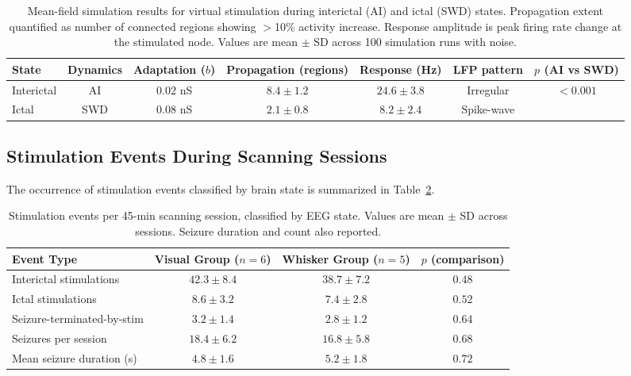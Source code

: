 \documentclass[11pt]{article}
\begin{document}
\begin{table}[H]
\centering
\caption{Mean-field simulation results for virtual stimulation during interictal (AI) and ictal (SWD) states. Propagation extent quantified as number of connected regions showing $>$10\% activity increase. Response amplitude is peak firing rate change at the stimulated node. Values are mean $\pm$ SD across 100 simulation runs with noise.}
\label{tab:simulation}
\begin{tabular}{lcccccc}
\toprule
\textbf{State} & \textbf{Dynamics} & \textbf{Adaptation ($b$)} & \textbf{Propagation (regions)} & \textbf{Response (Hz)} & \textbf{LFP pattern} & \textbf{$p$ (AI vs SWD)} \\
\midrule
Interictal & AI & $0.02$ nS & $8.4 \pm 1.2$ & $24.6 \pm 3.8$ & Irregular & \multirow{2}{*}{$< 0.001$} \\
Ictal & SWD & $0.08$ nS & $2.1 \pm 0.8$ & $8.2 \pm 2.4$ & Spike-wave & \\
\bottomrule
\end{tabular}
\end{table}

\subsection{Stimulation Events During Scanning Sessions}

The occurrence of stimulation events classified by brain state is summarized in Table~\ref{tab:events}.

\begin{table}[H]
\centering
\caption{Stimulation events per 45-min scanning session, classified by EEG state. Values are mean $\pm$ SD across sessions. Seizure duration and count also reported.}
\label{tab:events}
\begin{tabular}{lccc}
\toprule
\textbf{Event Type} & \textbf{Visual Group ($n=6$)} & \textbf{Whisker Group ($n=5$)} & \textbf{$p$ (comparison)} \\
\midrule
Interictal stimulations & $42.3 \pm 8.4$ & $38.7 \pm 7.2$ & $0.48$ \\
Ictal stimulations & $8.6 \pm 3.2$ & $7.4 \pm 2.8$ & $0.52$ \\
Seizure-terminated-by-stim & $3.2 \pm 1.4$ & $2.8 \pm 1.2$ & $0.64$ \\
Seizures per session & $18.4 \pm 6.2$ & $16.8 \pm 5.8$ & $0.68$ \\
Mean seizure duration (s) & $4.8 \pm 1.6$ & $5.2 \pm 1.8$ & $0.72$ \\
\bottomrule
\end{tabular}
\end{table}
\end{document}
